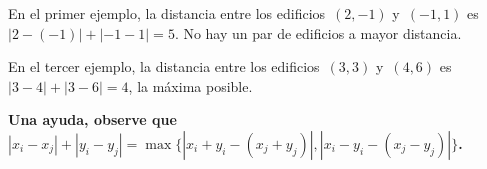 \exampleCases

\begin{example}
\end{example}

\explanationText

En el primer ejemplo, la distancia entre los edificios~$(2, -1)$ y~$(-1, 1)$
es~$|2 - (- 1)| + |-1 - 1| = 5$. No hay un par de edificios a mayor distancia.

En el tercer ejemplo, la distancia entre los edificios~$(3, 3)$ y~$(4, 6)$
es~$|3 - 4| + |3 - 6| = 4$, la máxima posible.

\textbf{Una ayuda, observe que~$|x_i - x_j| + |y_i - y_j| = \max \{|x_i + y_i - (x_j + y_j)|, |x_i - y_i - (x_j -
y_j)| \}$.}
